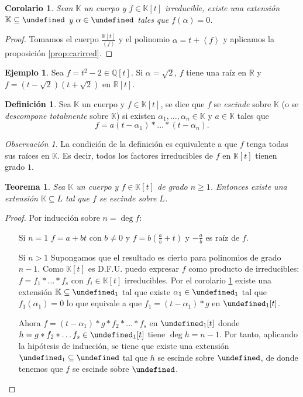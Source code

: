\documentclass[10pt, spanish]{report}
\newtheorem{tma}{Teorema}[chapter]
\newtheorem{cor}{Corolario}[tma]
\theoremstyle{definition}
\newtheorem*{defin}{Definición}
\newtheorem*{ej}{Ejemplo}
\theoremstyle{custom}
\theoremstyle{remark}
\newtheorem*{obs}{Observación}
\newcommand{\Q}{\mathbb{Q}}
\newcommand{\R}{\mathbb{R}}
\newcommand{\K}{\mathbb{K}}
\let\L\undefined
\newcommand{\L}{\mathbb{L}}
\renewcommand{\geq}{\geqslant}
\begin{document}
\begin{cor}\label{cor:existenciaextension}
    Sean $\K$ un cuerpo y $f\in\K[t]$ irreducible, existe una extensión
    $\K\subseteq\L$ y $\alpha\in\L$ tales que $f(\alpha)=0$.
\end{cor}

\begin{proof}
    Tomamos el cuerpo $\frac{\K[t]}{\left< f \right> }$ y el polinomio
    $\alpha=t+\left< f \right>$  y aplicamos la proposición
    \ref{prop:carirred}.
\end{proof}

\begin{ej}
    Sea $f=t^2-2\in \Q[t]$. Si $\alpha=\sqrt{2}$, $f$  tiene una raíz en $\R$ y
    $f=(t-\sqrt{2})(t+\sqrt{2})$ en $\R[t]$.
\end{ej}

\begin{defin}
    Sea $\K$ un cuerpo y $f\in\K[t]$, se dice que $f$ se \textit{escinde} sobre
    $\K$ (o se \textit{descompone totalmente} sobre $\K$) si existen $\alpha_1,
    \ldots,\alpha_n\in\K$ y $a\in\K$ tales que
    \[f=a(t-\alpha_1)*\ldots*(t-\alpha_n).\]
\end{defin}

\begin{obs}
    La condición de la definición es equivalente a que $f$ tenga todas sus
    raíces en $\K$. Es decir, todos los factores irreducibles de $f$ en $\K[t]$
    tienen grado $1$.
\end{obs}

\begin{tma}
    Sea $\K$ un cuerpo y $f\in\K[t]$ de grado $n\geq1$. Entonces existe una
    extensión $\K\subseteq L$ tal que $f$ se escinde sobre $L$.
\end{tma}

\begin{proof}
    Por inducción sobre $n=\deg{f}$:
    \begin{itemize}[itemindent=30pt]
        \item[Si $n=1$] $f=a+bt$ con $b\neq 0$ y $f=b(\frac{a}{b}+t)$ y
            $-\frac{a}{b}$ es raíz de $f$.
        \item[Si $n>1$] Supongamos que el resultado es cierto para polinomios de
            grado $n-1$. Como $\K[t]$ es D.F.U. puedo expresar $f$
            como producto de irreducibles: $f=f_1*\ldots*f_s$ con $f_i\in\K[t]$
            irreducibles. Por el corolario \ref{cor:existenciaextension}
            existe una extensión $\K\subseteq\L_1$ tal que existe
            $\alpha_1\in\L_1$ tal que $f_1(\alpha_1)=0$ lo que equivale a que
            $f_1=(t-\alpha_1)*g$ en $\L_1[t]$.

            Ahora $f=(t-\alpha_1)*g*f_2*\ldots*f_s$ en $\L_1[t]$ donde
            $h=g*f_2*\ldots f_s\in\L_1[t]$ tiene $\deg{h}=n-1$. Por tanto,
            aplicando la hipótesis de inducción, se tiene que existe una
            extensión $\L_1\subseteq\L$ tal que $h$ se escinde sobre $\L$, de
            donde tenemos que $f$ se escinde sobre $\L$.
    \end{itemize}
    \vspace{-1.75em}
\end{proof}
\end{document}
